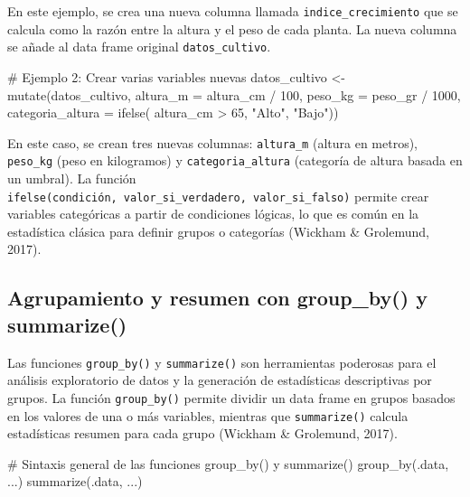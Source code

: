 \documentclass[
  spanish,
  a4paper,
  DIV=11,
  numbers=noendperiod,
  onepage,
  openany]{scrreprt}
\newenvironment{Shaded}{\begin{snugshade}}{\end{snugshade}}
\newcommand{\AttributeTok}[1]{\textcolor[rgb]{0.40,0.45,0.13}{#1}}
\newcommand{\CommentTok}[1]{\textcolor[rgb]{0.37,0.37,0.37}{#1}}
\newcommand{\DecValTok}[1]{\textcolor[rgb]{0.68,0.00,0.00}{#1}}
\newcommand{\FunctionTok}[1]{\textcolor[rgb]{0.28,0.35,0.67}{#1}}
\newcommand{\NormalTok}[1]{\textcolor[rgb]{0.00,0.23,0.31}{#1}}
\newcommand{\OtherTok}[1]{\textcolor[rgb]{0.00,0.23,0.31}{#1}}
\newcommand{\SpecialCharTok}[1]{\textcolor[rgb]{0.37,0.37,0.37}{#1}}
\newcommand{\StringTok}[1]{\textcolor[rgb]{0.13,0.47,0.30}{#1}}
\begin{document}
En este ejemplo, se crea una nueva columna llamada
\texttt{indice\_crecimiento} que se calcula como la razón entre la
altura y el peso de cada planta. La nueva columna se añade al data frame
original \texttt{datos\_cultivo}.

\begin{Shaded}
\begin{Highlighting}[]
\CommentTok{\# Ejemplo 2: Crear varias variables nuevas}
\NormalTok{datos\_cultivo }\OtherTok{\textless{}{-}} \FunctionTok{mutate}\NormalTok{(datos\_cultivo,}
                       \AttributeTok{altura\_m =}\NormalTok{ altura\_cm }\SpecialCharTok{/} \DecValTok{100}\NormalTok{,}
                       \AttributeTok{peso\_kg =}\NormalTok{ peso\_gr }\SpecialCharTok{/} \DecValTok{1000}\NormalTok{,}
                       \AttributeTok{categoria\_altura =} \FunctionTok{ifelse}\NormalTok{(}
\NormalTok{                         altura\_cm }\SpecialCharTok{\textgreater{}} \DecValTok{65}\NormalTok{, }\StringTok{"Alto"}\NormalTok{, }\StringTok{"Bajo"}\NormalTok{))}
\end{Highlighting}
\end{Shaded}

En este caso, se crean tres nuevas columnas: \texttt{altura\_m} (altura
en metros), \texttt{peso\_kg} (peso en kilogramos) y
\texttt{categoria\_altura} (categoría de altura basada en un umbral). La
función
\texttt{ifelse(condición,\ valor\_si\_verdadero,\ valor\_si\_falso)}
permite crear variables categóricas a partir de condiciones lógicas, lo
que es común en la estadística clásica para definir grupos o categorías
(Wickham \& Grolemund, 2017).

\subsection{Agrupamiento y resumen con group\_by() y
summarize()}\label{agrupamiento-y-resumen-con-group_by-y-summarize}

Las funciones \texttt{group\_by()} y \texttt{summarize()} son
herramientas poderosas para el análisis exploratorio de datos y la
generación de estadísticas descriptivas por grupos. La función
\texttt{group\_by()} permite dividir un data frame en grupos basados en
los valores de una o más variables, mientras que \texttt{summarize()}
calcula estadísticas resumen para cada grupo (Wickham \& Grolemund,
2017).

\begin{Shaded}
\begin{Highlighting}[]
\CommentTok{\# Sintaxis general de las funciones group\_by() y summarize()}
\FunctionTok{group\_by}\NormalTok{(.data, ...)}
\FunctionTok{summarize}\NormalTok{(.data, ...)}
\end{Highlighting}
\end{Shaded}
\end{document}
